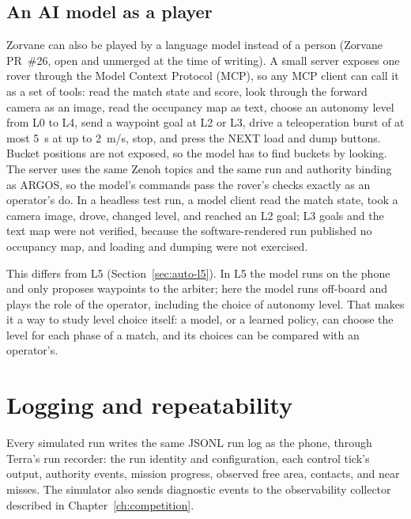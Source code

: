 \subsection{An AI model as a player}
\label{sec:sim-mcp}

Zorvane can also be played by a language model instead of a person (Zorvane PR~\#26, open and unmerged at the time of writing).
A small server exposes one rover through the Model Context Protocol (MCP), so any MCP client can call it as a set of tools: read the match state and score, look through the forward camera as an image, read the occupancy map as text, choose an autonomy level from L0 to L4, send a waypoint goal at L2 or L3, drive a teleoperation burst of at most 5~s at up to 2~m/s, stop, and press the NEXT load and dump buttons.
Bucket positions are not exposed, so the model has to find buckets by looking.
The server uses the same Zenoh topics and the same run and authority binding as ARGOS, so the model's commands pass the rover's checks exactly as an operator's do.
In a headless test run, a model client read the match state, took a camera image, drove, changed level, and reached an L2 goal; L3 goals and the text map were not verified, because the software-rendered run published no occupancy map, and loading and dumping were not exercised.

This differs from L5 (Section~\ref{sec:auto-l5}).
In L5 the model runs on the phone and only proposes waypoints to the arbiter; here the model runs off-board and plays the role of the operator, including the choice of autonomy level.
That makes it a way to study level choice itself: a model, or a learned policy, can choose the level for each phase of a match, and its choices can be compared with an operator's.

\section{Logging and repeatability}
\label{sec:sim-logging}

Every simulated run writes the same JSONL run log as the phone, through Terra's run recorder: the run identity and configuration, each control tick's output, authority events, mission progress, observed free area, contacts, and near misses.
The simulator also sends diagnostic events to the observability collector described in Chapter~\ref{ch:competition}.

